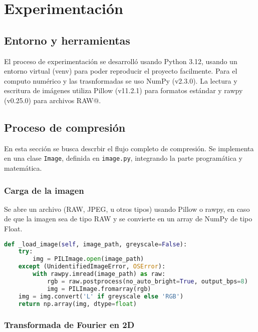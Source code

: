 \section{Experimentación}

\subsection{Entorno y herramientas}

El proceso de experimentación se desarrolló usando Python 3.12, usando un entorno virtual (venv) para poder reproducir el proyecto facilmente. Para el computo numérico y las trasnformadas se uso NumPy (v2.3.0). La lectura y escritura de imágenes utiliza Pillow (v11.2.1) para formatos estándar y rawpy (v0.25.0) para archivos RAW@.

\subsection{Proceso de compresión}

En esta sección se busca descrbir el flujo completo de compresión.
Se implementa en una clase \texttt{Image}, definida en \texttt{image.py}, integrando la parte programática y matemática.

\subsubsection{Carga de la imagen}

Se abre un archivo (RAW, JPEG, u otros tipos) usando Pillow o rawpy, en caso de que la imagen sea de tipo RAW y se convierte en un array de NumPy de tipo Float.

\begin{lstlisting}[language=Python, caption={Método \_load\_image}, label={lst:load_image}]
def _load_image(self, image_path, greyscale=False):
    try:
        img = PILImage.open(image_path)
    except (UnidentifiedImageError, OSError):
        with rawpy.imread(image_path) as raw:
            rgb = raw.postprocess(no_auto_bright=True, output_bps=8)
            img = PILImage.fromarray(rgb)
    img = img.convert('L' if greyscale else 'RGB')
    return np.array(img, dtype=float)
\end{lstlisting}

\subsubsection{Transformada de Fourier en 2D}

